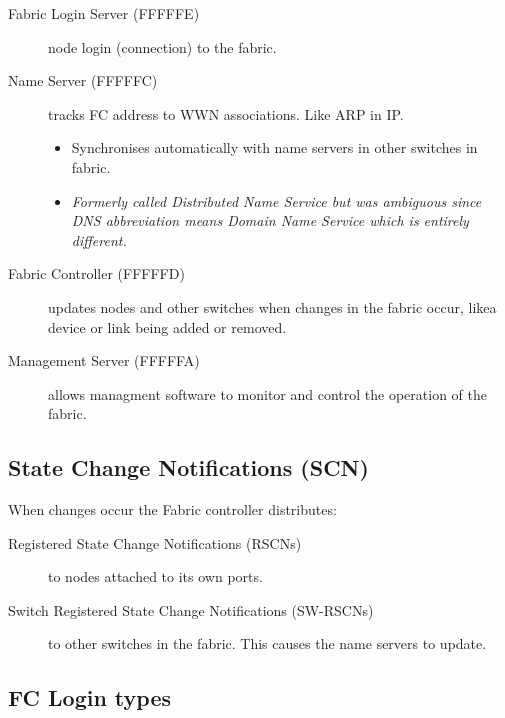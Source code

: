 \documentclass[slides]{pgnotes}
\begin{document}
\begin{description}
\item[Fabric Login Server (FFFFFE)] node login (connection) to the fabric.
\item[Name Server (FFFFFC)] tracks FC address to WWN associations. Like ARP in IP.
\begin{itemize}
\item
  Synchronises automatically with name servers in other switches in fabric.
\item
  \emph{Formerly called Distributed Name Service but was ambiguous since
  DNS abbreviation means Domain Name Service which is entirely
  different.}
\end{itemize}
\item[Fabric Controller (FFFFFD)]updates nodes and other switches when changes in the fabric occur, likea device or link being added or removed.
\item[Management Server (FFFFFA)]
  allows managment software to monitor and control the operation of the
  fabric.
\end{description}


\subsection{State Change Notifications (SCN)}

When changes occur the Fabric controller distributes: 
\begin{description}
\item[Registered State Change Notifications (RSCNs)]
  to nodes attached to its own ports.
\item[Switch Registered State Change Notifications (SW-RSCNs)]
  to other switches in the fabric. This causes the name servers to update.
\end{description}


\subsection{FC Login types}
\label{sec:fc-login-types}
\end{document}

